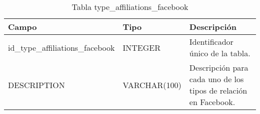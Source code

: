 \bigskip
\par
\begin{table}[h]
\begin{center}
\begin{tabular}{| l | l | p{60mm} |}\hline
\textbf{Campo}&\textbf{Tipo}&\textbf{Descripción} \\ \hline
id\_type\_affiliations\_facebook & INTEGER & Identificador único de la tabla. \\ \hline
DESCRIPTION & VARCHAR(100) & Descripción para cada uno de los tipos de relación en Facebook. \\ \hline
\end{tabular}
\end{center}
\caption{Tabla type\_affiliations\_facebook} \label{tabTypeAffiliationsFacebook}
\end{table}


